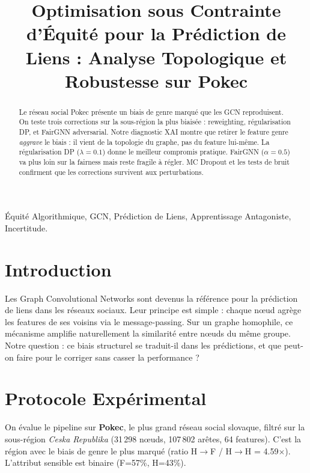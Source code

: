 \documentclass[conference, a4paper]{IEEEtran}
\title{Optimisation sous Contrainte d'Équité pour la Prédiction de Liens : Analyse Topologique et Robustesse sur Pokec}
\author{
\IEEEauthorblockN{Younes Boutrouft\IEEEauthorrefmark{1},
Amir Kashani\IEEEauthorrefmark{1},
Mehdi Ait Hamma\IEEEauthorrefmark{7},
Tahiana Hajanirina Andriambahoaka\IEEEauthorrefmark{1}}
\IEEEauthorblockA{\textit{\IEEEauthorrefmark{1}MS Data \quad \IEEEauthorrefmark{7}MS IA}\\
\textit{Télécom Paris}}
}
\begin{document}
\maketitle

\begin{abstract}
Le réseau social Pokec présente un biais de genre marqué que les GCN reproduisent. On teste trois corrections sur la sous-région la plus biaisée : reweighting, régularisation DP, et FairGNN adversarial. Notre diagnostic XAI montre que retirer le feature genre \emph{aggrave} le biais : il vient de la topologie du graphe, pas du feature lui-même. La régularisation DP ($\lambda=0.1$) donne le meilleur compromis pratique. FairGNN ($\alpha=0.5$) va plus loin sur la fairness mais reste fragile à régler. MC Dropout et les tests de bruit confirment que les corrections survivent aux perturbations.
\end{abstract}

\begin{IEEEkeywords}
Équité Algorithmique, GCN, Prédiction de Liens, Apprentissage Antagoniste, Incertitude.
\end{IEEEkeywords}

\section{Introduction}
Les Graph Convolutional Networks \cite{kipf2017semi} sont devenus la référence pour la prédiction de liens dans les réseaux sociaux. Leur principe est simple : chaque nœud agrège les features de ses voisins via le message-passing. Sur un graphe homophile, ce mécanisme amplifie naturellement la similarité entre nœuds du même groupe. Notre question : ce biais structurel se traduit-il dans les prédictions, et que peut-on faire pour le corriger sans casser la performance ?

\section{Protocole Expérimental}
On évalue le pipeline sur \textbf{Pokec}, le plus grand réseau social slovaque, filtré sur la sous-région \textit{Ceska Republika} (31\,298 nœuds, 107\,802 arêtes, 64 features). C'est la région avec le biais de genre le plus marqué (ratio H$\to$F / H$\to$H = 4.59$\times$). L'attribut sensible est binaire (F=57\%, H=43\%).
\end{document}
